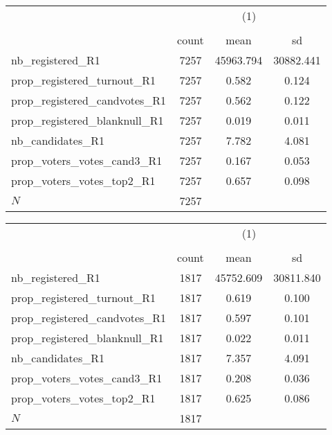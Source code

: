 {
\def\sym#1{\ifmmode^{#1}\else\(^{#1}\)\fi}
\begin{tabular}{l*{1}{ccc}}
\hline\hline
            &\multicolumn{3}{c}{(1)}               \\
            &\multicolumn{3}{c}{}                  \\
            &       count&        mean&          sd\\
\hline
nb\_registered\_R1&        7257&   45963.794&   30882.441\\
prop\_registered\_turnout\_R1&        7257&       0.582&       0.124\\
prop\_registered\_candvotes\_R1&        7257&       0.562&       0.122\\
prop\_registered\_blanknull\_R1&        7257&       0.019&       0.011\\
nb\_candidates\_R1&        7257&       7.782&       4.081\\
prop\_voters\_votes\_cand3\_R1&        7257&       0.167&       0.053\\
prop\_voters\_votes\_top2\_R1&        7257&       0.657&       0.098\\
\hline
\(N\)       &        7257&            &            \\
\hline\hline
\end{tabular}
}
{
\def\sym#1{\ifmmode^{#1}\else\(^{#1}\)\fi}
\begin{tabular}{l*{1}{ccc}}
\hline\hline
            &\multicolumn{3}{c}{(1)}               \\
            &\multicolumn{3}{c}{}                  \\
            &       count&        mean&          sd\\
\hline
nb\_registered\_R1&        1817&   45752.609&   30811.840\\
prop\_registered\_turnout\_R1&        1817&       0.619&       0.100\\
prop\_registered\_candvotes\_R1&        1817&       0.597&       0.101\\
prop\_registered\_blanknull\_R1&        1817&       0.022&       0.011\\
nb\_candidates\_R1&        1817&       7.357&       4.091\\
prop\_voters\_votes\_cand3\_R1&        1817&       0.208&       0.036\\
prop\_voters\_votes\_top2\_R1&        1817&       0.625&       0.086\\
\hline
\(N\)       &        1817&            &            \\
\hline\hline
\end{tabular}
}
